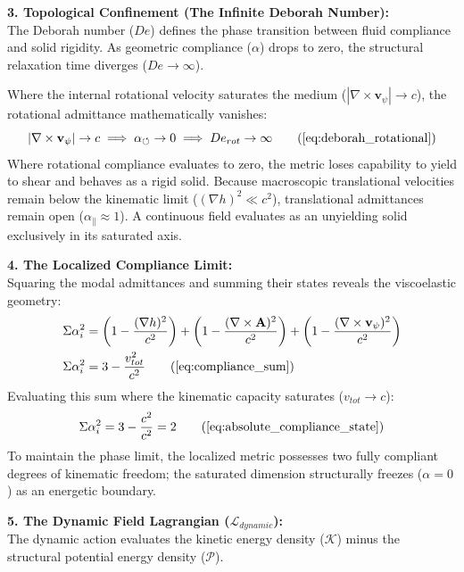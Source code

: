 \documentclass[11pt, a4paper]{article}
\begin{document}
\textbf{3. Topological Confinement (The Infinite Deborah Number):} \\
The Deborah number ($De$) defines the phase transition between fluid compliance and solid rigidity. As geometric compliance ($\alpha$) drops to zero, the structural relaxation time diverges ($De \to \infty$). 

Where the internal rotational velocity saturates the medium ($|\nabla \times \mathbf{v}_{\psi}| \to c$), the rotational admittance mathematically vanishes:
\begin{equation}
    |\nabla \times \mathbf{v}_{\psi}| \to c \implies \alpha_{\circlearrowleft} \to 0 \implies De_{rot} \to \infty \tag{\ref{eq:deborah_rotational}}
\end{equation}
Where rotational compliance evaluates to zero, the metric loses capability to yield to shear and behaves as a rigid solid. Because macroscopic translational velocities remain below the kinematic limit ($(\nabla h)^2 \ll c^2$), translational admittances remain open ($\alpha_{\parallel} \approx 1$). A continuous field evaluates as an unyielding solid exclusively in its saturated axis.

\textbf{4. The Localized Compliance Limit:} \\
Squaring the modal admittances and summing their states reveals the viscoelastic geometry:
\begin{align}
    \Sigma \alpha_i^2 &= \left(1 - \frac{(\nabla h)^2}{c^2}\right) + \left(1 - \frac{(\nabla \times \mathbf{A})^2}{c^2}\right) + \left(1 - \frac{(\nabla \times \mathbf{v}_{\psi})^2}{c^2}\right) \nonumber \\
    \Sigma \alpha_i^2 &= 3 - \frac{v_{tot}^2}{c^2} \tag{\ref{eq:compliance_sum}}
\end{align}
Evaluating this sum where the kinematic capacity saturates ($v_{tot} \to c$):
\begin{equation}
    \Sigma \alpha_i^2 = 3 - \frac{c^2}{c^2} = 2 \tag{\ref{eq:absolute_compliance_state}}
\end{equation}
To maintain the phase limit, the localized metric possesses two fully compliant degrees of kinematic freedom; the saturated dimension structurally freezes ($\alpha = 0$) as an energetic boundary.

\textbf{5. The Dynamic Field Lagrangian ($\mathcal{L}_{dynamic}$):} \\
The dynamic action evaluates the kinetic energy density ($\mathcal{K}$) minus the structural potential energy density ($\mathcal{P}$).
\end{document}
